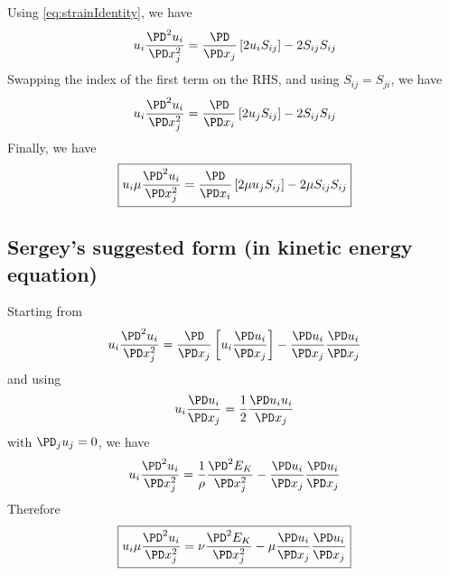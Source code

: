 \documentclass[11pt]{article}
\begin{document}
Using \ref{eq:strainIdentity}, we have
\begin{equation}
	u_i \frac{\PD^2 u_i}{\PD x_j^2} =
	\frac{\PD}{\PD x_j} \left[ 2 u_i S_{ij} \right] -
	2 S_{ij} S_{ij}
\end{equation}
Swapping the index of the first term on the RHS, and using $S_{ij}=S_{ji}$, we have
\begin{equation}
	u_i \frac{\PD^2 u_i}{\PD x_j^2} =
	\frac{\PD}{\PD x_i} \left[ 2 u_j S_{ij} \right] -
	2 S_{ij} S_{ij}
\end{equation}
Finally, we have
\begin{equation}
	\boxed{
	u_i \mu \frac{\PD^2 u_i}{\PD x_j^2} =
	\frac{\PD}{\PD x_i} \left[ 2 \mu u_j S_{ij} \right] -
	2 \mu S_{ij} S_{ij}
	}
\end{equation}

\subsection{Sergey's suggested form (in kinetic energy equation)}
Starting from
\begin{equation}
	u_i \frac{\PD^2 u_i}{\PD x_j^2} =
	\frac{\PD}{\PD x_j} \left[ u_i \frac{\PD u_i}{\PD x_j} \right] -
	\frac{\PD u_i}{\PD x_j}\frac{\PD u_i}{\PD x_j}
\end{equation}
and using
\begin{equation}
	u_i \frac{\PD u_i}{\PD x_j} =
	\frac{1}{2} \frac{\PD u_i u_i}{\PD x_j}
\end{equation}
with $\PD_j u_j = 0$, we have
\begin{equation}
	u_i \frac{\PD^2 u_i}{\PD x_j^2} =
	\frac{1}{\rho} \frac{\PD^2 E_K}{\PD x_j^2} -
	\frac{\PD u_i}{\PD x_j}\frac{\PD u_i}{\PD x_j}
\end{equation}
Therefore
\begin{equation}
	\boxed{
	u_i \mu \frac{\PD^2 u_i}{\PD x_j^2} =
	\nu \frac{\PD^2 E_K}{\PD x_j^2} -
	\mu \frac{\PD u_i}{\PD x_j}\frac{\PD u_i}{\PD x_j}
	}
\end{equation}
\end{document}
